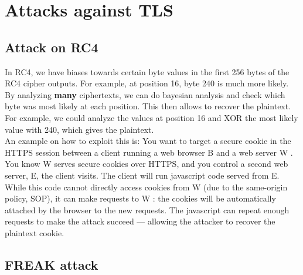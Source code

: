 \documentclass[11pt,oneside,a4paper]{article}
\begin{document}
\newpage

\section{Attacks against TLS}

\subsection{Attack on RC4}
\label{attack_on_rc4}

In RC4, we have biases towards certain byte values in the first 256 bytes of the RC4 cipher outputs. For example, at position 16, byte 240 is much more likely.\\
By analyzing \textbf{many} ciphertexts, we can do bayesian analysis and check which byte was most likely at each position. This then allows to recover the plaintext. For example, we could analyze the values at position 16 and XOR the most likely value with 240, which gives the plaintext.\\
An example on how to exploit this is: You want to target a secure cookie in the HTTPS session between a client running a web browser B and a web server W . You know W serves secure cookies over HTTPS, and you control a second web server, E, the client visits. The client will run javascript code served from E. While this code cannot directly access cookies from W (due to the same-origin policy, SOP), it can make requests to W : the cookies will be automatically attached by the browser to the new requests. The javascript can repeat enough requests to make the attack succeed — allowing the attacker to recover the plaintext cookie.

\subsection{FREAK attack}
\end{document}
